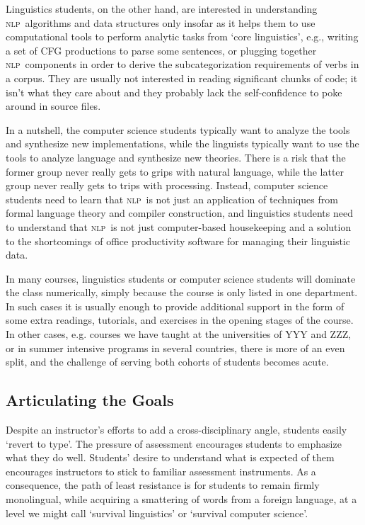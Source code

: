 \documentclass[11pt]{article}
\newcommand{\NLP}{\textsc{nlp}}
\begin{document}
Linguistics students, on the other hand, are interested in
understanding \NLP\ algorithms and data structures only insofar as it helps them
to use computational tools to perform analytic tasks from `core linguistics',
e.g., writing a set of CFG productions to parse some sentences, or
plugging together \NLP\ components in order to derive the subcategorization
requirements of verbs in a corpus.
They are usually not interested in reading significant chunks of code;
it isn't what they care about and they
probably lack the self-confidence to poke around in source files.

In a nutshell, the computer science students typically want to analyze
the tools and synthesize new implementations, while the linguists
typically want to use the tools to analyze language and
synthesize new theories.  There is a risk that the former group
never really gets to grips with natural language, while the latter
group never really gets to trips with processing.  Instead,
computer science students need to learn that \NLP\ is not just an
application of techniques from formal language theory and compiler
construction, and linguistics students need to understand that \NLP\ is not
just computer-based housekeeping and a solution to the shortcomings of
office productivity software for managing their linguistic data.

In many courses, linguistics students or computer science students
will dominate the class numerically, simply because the course is only
listed in one department.  In such cases it is usually enough to
provide additional support in the form of some extra readings,
tutorials, and exercises in the opening stages of the course.  In
other cases, e.g. courses we have taught at the universities of YYY and ZZZ,
or in summer intensive programs in several countries,
there is more of an even split, and the challenge of serving
both cohorts of students becomes acute.

\subsection{Articulating the Goals}

Despite an instructor's efforts to add a cross-disciplinary angle, students
easily `revert to type'.  The pressure of assessment encourages students to emphasize
what they do well.  Students' desire to understand what is expected of them encourages
instructors to stick to familiar assessment instruments.  As a consequence,
the path of least resistance is for students to remain firmly monolingual, while
acquiring a smattering of words from a foreign language, at a level we might
call `survival linguistics' or `survival computer science'.
\end{document}
